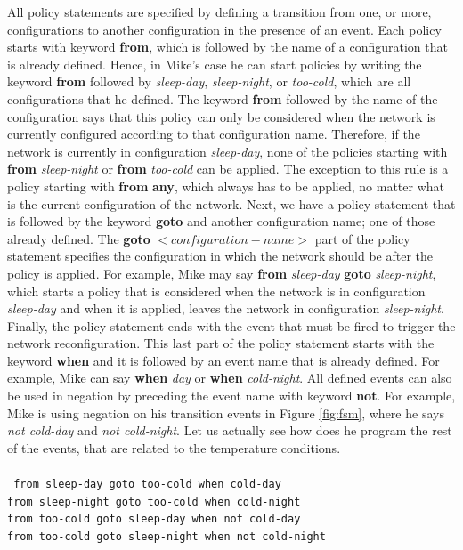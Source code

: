 \documentclass[11pt]{article}
\begin{document}
All policy statements are specified by defining a transition from one, or
more, configurations to another configuration in the presence of an event.
Each policy starts with keyword \textbf{from}, which is followed by the
name of a configuration that is already defined. Hence, in Mike's case he
can start policies by writing the keyword \textbf{from} followed by
\textit{sleep-day}, \textit{sleep-night}, or \textit{too-cold}, which are
all configurations that he defined. The keyword \textbf{from} followed by
the name of the configuration says that this policy can only be considered 
when the network is currently configured according to that configuration
name. Therefore, if the network is currently in configuration
\textit{sleep-day}, none of the policies starting with \textbf{from}
\textit{sleep-night} or \textbf{from} \textit{too-cold} can be applied. The
exception to this rule is a policy starting with \textbf{from}
\textbf{any}, which always has to be applied, no matter what is the current
configuration of the network. Next, we have a policy statement that is
followed by the keyword \textbf{goto} and another configuration name; one
of those already defined. The \textbf{goto} $<configuration-name>$ part of 
the policy statement specifies the configuration in which the network
should be after the policy is applied. For example, Mike may say
\textbf{from} \textit{sleep-day} \textbf{goto} \textit{sleep-night}, which 
starts a policy that is considered when the network is in configuration
\textit{sleep-day} and when it is applied, leaves the network in
configuration \textit{sleep-night}. Finally, the policy statement ends with
the event that must be fired to trigger the network reconfiguration. This
last part of the policy statement starts with the keyword \textbf{when} and
it is followed by an event name that is already defined. For example, Mike 
can say \textbf{when} \textit{day} or \textbf{when} \textit{cold-night}.
All defined events can also be used in negation by preceding the event name
with keyword \textbf{not}. For example, Mike is using negation on his
transition events in Figure \ref{fig:fsm}, where he says
\textit{not cold-day} and \textit{not cold-night}. Let us actually see how 
does he program the rest of the events, that are related to the temperature
conditions.								\\
\\
\texttt{
from sleep-day goto too-cold when cold-day				\\
from sleep-night goto too-cold when cold-night				\\
from too-cold goto sleep-day when not cold-day				\\
from too-cold goto sleep-night when not cold-night			\\
}									\\
\end{document}

